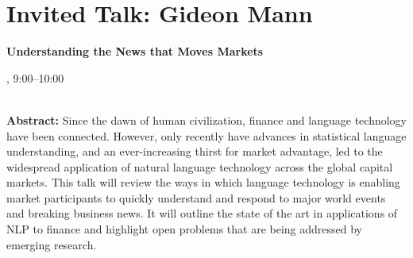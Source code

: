\section{Invited Talk: Gideon Mann}

\begin{center}
\begin{Large}
    {\bfseries\Large Understanding the News that Moves Markets} \vspace{1em}\par
\end{Large}


\daydateyear, 9:00--10:00 \vspace{1em}\\
\PlenaryLoc \\
\vspace{1em}\par
\end{center}

\noindent
{\bfseries Abstract:} Since the dawn of human civilization, finance and language technology have been connected. However, only recently have advances in statistical language understanding, and an ever-increasing thirst for market advantage, led to the widespread application of natural language technology across the global capital markets. This talk will review the ways in which language technology is enabling market participants to quickly understand and respond to major world events and breaking business news. It will outline the state of the art in applications of NLP to finance and highlight open problems that are being addressed by emerging research.
\vspace{3em}\par 

\vfill
\noindent

